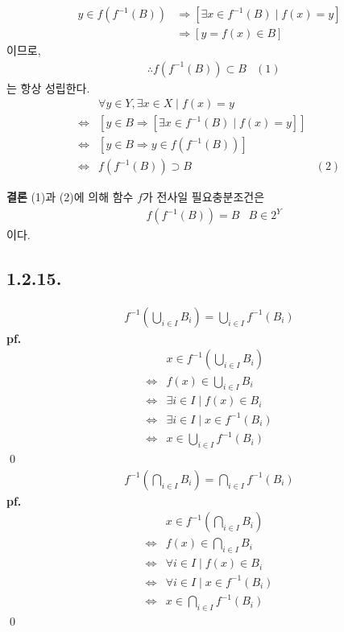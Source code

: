\documentclass{article}
\begin{document}
\begin{align*}
y \in f(f^{-1}(B)) &\Rightarrow [\exists x \in f^{-1}(B) \mid f(x) = y] 
\\ &\Rightarrow [y = f(x) \in B]
\end{align*}
이므로, 
\begin{align*}
&\therefore f(f^{-1}(B)) \subset B & (1)
\end{align*}
는 항상 성립한다.
\begin{align*}
& \forall y \in Y, \exists x \in X \mid f(x) = y
\\ \iff& \left[y \in B \Rightarrow [\exists x \in f^{-1}(B) \mid f(x) = y]  \right]
\\ \iff& \left[y \in B \Rightarrow y \in f(f^{-1}(B)) \right]
\\ \iff& f(f^{-1}(B)) \supset B & (2)
\end{align*}


\textbf{결론} (1)과 (2)에 의해 함수 $f$가 전사일 필요충분조건은 
\begin{align*}
&f(f^{-1}(B)) = B &B \in 2^Y
\end{align*}이다.

\subsection{1.2.15.}

\begin{align*}f^{-1}\left(\bigcup_{i \in I} B_i\right) = \bigcup_{i \in I} f^{-1}(B_i)\end{align*}
\textbf{pf.}
\begin{align*}
&x \in f^{-1}\left(\bigcup_{i \in I} B_i\right)
\\ \iff& f(x) \in \bigcup_{i \in I} B_i
\\ \iff& \exists i \in I \mid f(x) \in B_i
\\ \iff& \exists i \in I \mid x \in f^{-1}(B_i)
\\ \iff& x \in \bigcup_{i \in I} f^{-1}(B_i)
\end{align*} \qed
\begin{align*}f^{-1}\left(\bigcap_{i \in I} B_i\right) = \bigcap_{i \in I} f^{-1}(B_i)\end{align*}
\textbf{pf.}
\begin{align*}
&x \in f^{-1}\left(\bigcap_{i \in I} B_i\right)
\\ \iff& f(x) \in \bigcap_{i \in I} B_i
\\ \iff& \forall i \in I \mid f(x) \in B_i
\\ \iff& \forall i \in I \mid x \in f^{-1}(B_i)
\\ \iff& x \in \bigcap_{i \in I} f^{-1}(B_i) 
\end{align*} \qed
\end{document}
